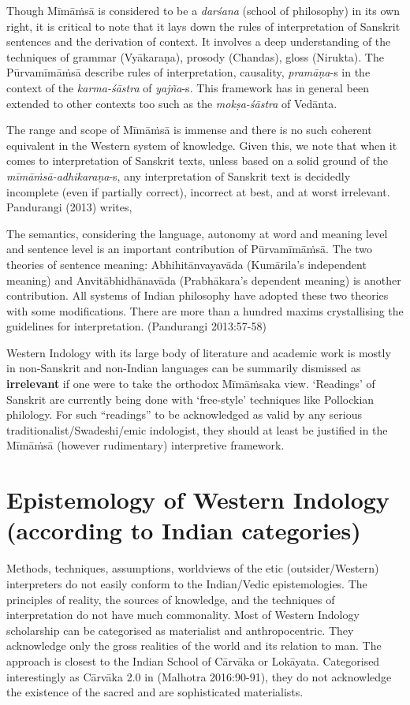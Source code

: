 Though Mīmāṁsā is considered to be a {\sl darśana} (school of philosophy) in its own right, it is critical to note that it lays down the rules of interpretation of Sanskrit sentences and the derivation of context. It involves a deep understanding of the techniques of grammar (Vyākaraṇa), prosody (Chandas), gloss (Nirukta). The Pūrvamīmāṁsā describe rules of interpretation, causality, {\sl pramāṇa}-s in the context of the {\sl karma-śāstra} of {\sl yajña}-s. This framework has in general been extended to other contexts too such as the {\sl mokṣa-śāstra} of Vedānta.

The range and scope of Mīmāṁsā is immense and there is no such coherent equivalent in the Western system of knowledge. Given this, we note that when it comes to interpretation of Sanskrit texts, unless based on a solid ground of the {\sl mīmāṁsā-adhikaraṇa}-s, any interpretation of Sanskrit text is decidedly incomplete (even if partially correct), incorrect at best, and at worst irrelevant. Pandurangi (2013) writes,
\begin{myquote}
The semantics, considering the language, autonomy at word and meaning level and sentence level is an important contribution of Pūrvamīmāṁsā. The two theories of sentence meaning: Abhihitānvayavāda (Kumārila's independent meaning) and Anvitābhidhānavāda (Prabhākara's dependent meaning) is another contribution. All systems of Indian philosophy have adopted these two theories with some modifications. There are more than a hundred maxims crystallising the guidelines for interpretation. \hfill (Pandurangi 2013:57-58)
\end{myquote}

Western Indology with its large body of literature and academic work is mostly in non-Sanskrit and non-Indian languages can be summarily dismissed as {\bf irrelevant} if one were to take the orthodox Mīmāṁsaka view. `Readings' of Sanskrit are currently being done with `free-style' techniques like Pollockian philology. For such ``readings'' to be acknowledged as valid by any serious traditionalist/Swadeshi/emic indologist, they should at least be justified in the Mīmāṁsā (however rudimentary) interpretive framework. 

\section*{Epistemology of Western Indology (according to Indian categories)}

Methods, techniques, assumptions, worldviews of the etic (outsider/Western) interpreters do not easily conform to the Indian/Vedic epistemologies. The principles of reality, the sources of knowledge, and the techniques of interpretation do not have much commonality. Most of Western Indology scholarship can be categorised as materialist and anthropocentric. They acknowledge only the gross realities of the world and its relation to man. The approach is closest to the Indian School of Cārvāka or Lokāyata. Categorised interestingly as Cārvāka 2.0 in (Malhotra 2016:90-91), they do not acknowledge the existence of the sacred and are sophisticated materialists.

